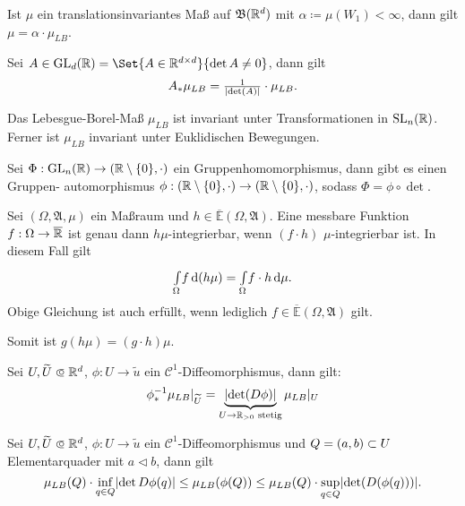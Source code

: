 \documentclass{cheat-sheet}
\newcommand{\Alg}{\mathfrak{A}} %
\newcommand{\Bor}{\mathfrak{B}} %
\newcommand{\E}{\mathbb{E}} %
\theoremstyle{definition}
\newcommand{\IntO}[2]{\Int{\Omega}{}{#1}{#2}} %
\newcommand{\IntOmu}[1]{\Int{\Omega}{}{#1}{\mu}} %
\begin{document}
\begin{satz}
  Ist $\mu$ ein translationsinvariantes Maß auf $\Bor(\R^d)$ mit $\alpha \coloneqq \mu(W_1) < \infty$, dann gilt $\mu = \alpha \cdot \mu_{LB}$.
\end{satz}

\begin{satz}
  Sei $A \in \mathrm{GL}_d(\R) = \Set{ A \in \R^{d \times d} }{ \det A \not= 0 }$, dann gilt
  \[ A_* \mu_{LB} = \tfrac{1}{\lvert\det(A)\rvert} \cdot \mu_{LB}. \]
\end{satz}

\begin{satz}
  Das Lebesgue-Borel-Maß $\mu_{LB}$ ist invariant unter Transformationen in $\mathrm{SL}_n(\mathbb{R})$. Ferner ist $\mu_{LB}$ invariant unter Euklidischen Bewegungen.
\end{satz}


\begin{satz}
  Sei $\Phi : \mathrm{GL}_n(\mathbb{R}) \to (\mathbb{R} \setminus \{0\}, \cdot)$ ein Gruppenhomomorphismus, dann gibt es einen Gruppen- automorphismus $\phi : (\mathbb{R} \setminus \{0\}, \cdot) \to (\mathbb{R} \setminus \{0\}, \cdot)$, sodass $\Phi = \phi \circ \det$.
\end{satz}

\begin{satz}
  Sei $(\Omega, \Alg, \mu)$ ein Maßraum und $h \in \overline{\E}(\Omega, \Alg)$. Eine messbare Funktion $f : \Omega \to \overline{\mathbb{R}}$ ist genau dann $h\mu$-integrierbar, wenn $(f \cdot h)$ $\mu$-integrierbar ist. In diesem Fall gilt
  \[ \IntO{f}{(h \mu)} = \IntOmu{f \cdot h}. \]
  Obige Gleichung ist auch erfüllt, wenn lediglich $f \in \overline{\E}(\Omega, \Alg)$ gilt.
\end{satz}


\begin{bem}
  Somit ist $g (h \mu) = (g \cdot h) \mu$.
\end{bem}

\begin{satz}
  Sei $U, \widetilde{U} \opn \R^d$, $\phi : U \to \widetilde{u}$ ein $\mathcal{C}^1$-Diffeomorphismus, dann gilt:
    \[ \phi_*^{-1} \mu_{LB}|_{\widetilde{U}} = \underbrace{\lvert\det(D \phi)\rvert}_{U \to \mathbb{R}_{> 0} \text{ stetig}} \mu_{LB}|_U \]
\end{satz}

\begin{satz}
  Sei $U, \widetilde{U} \opn \R^d$, $\phi : U \to \widetilde{u}$ ein $\mathcal{C}^1$-Diffeomorphismus und $Q = \left( a, b \right) \subset U$ Elementarquader mit $a \lhd b$, dann gilt
  \[ \mu_{LB}(Q) \cdot \inf_{q \in Q} \lvert\det D \phi(q)\rvert \leq \mu_{LB}(\phi(Q)) \leq \mu_{LB}(Q) \cdot \sup_{q \in Q} \lvert\det(D(\phi(q)))\rvert. \]
\end{satz}
\end{document}
